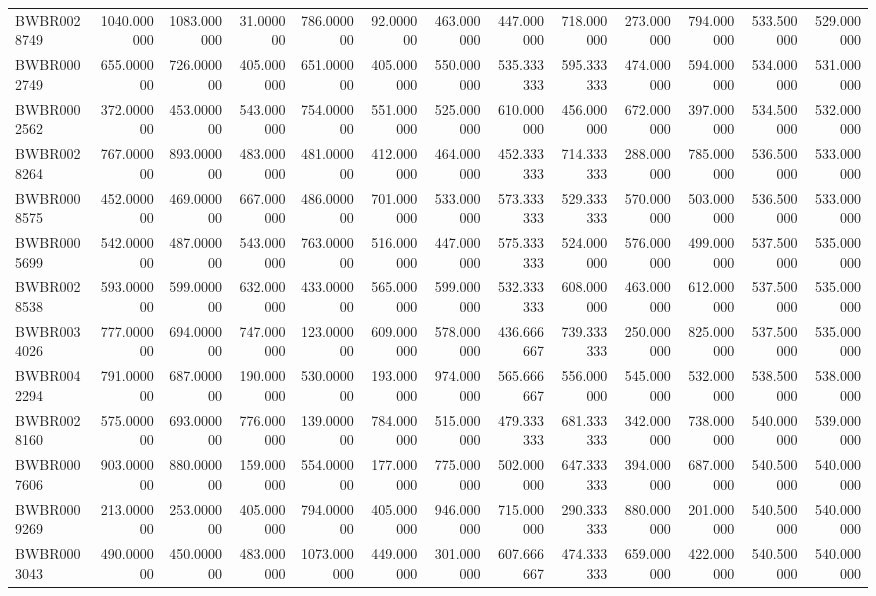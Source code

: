 \begin{longtable}{lrrrrrrrrrrrr}
BWBR0028749 & 1040.000000 & 1083.000000 & 31.000000 & 786.000000 & 92.000000 & 463.000000 & 447.000000 & 718.000000 & 273.000000 & 794.000000 & 533.500000 & 529.000000 \\
BWBR0002749 & 655.000000 & 726.000000 & 405.000000 & 651.000000 & 405.000000 & 550.000000 & 535.333333 & 595.333333 & 474.000000 & 594.000000 & 534.000000 & 531.000000 \\
BWBR0002562 & 372.000000 & 453.000000 & 543.000000 & 754.000000 & 551.000000 & 525.000000 & 610.000000 & 456.000000 & 672.000000 & 397.000000 & 534.500000 & 532.000000 \\
BWBR0028264 & 767.000000 & 893.000000 & 483.000000 & 481.000000 & 412.000000 & 464.000000 & 452.333333 & 714.333333 & 288.000000 & 785.000000 & 536.500000 & 533.000000 \\
BWBR0008575 & 452.000000 & 469.000000 & 667.000000 & 486.000000 & 701.000000 & 533.000000 & 573.333333 & 529.333333 & 570.000000 & 503.000000 & 536.500000 & 533.000000 \\
BWBR0005699 & 542.000000 & 487.000000 & 543.000000 & 763.000000 & 516.000000 & 447.000000 & 575.333333 & 524.000000 & 576.000000 & 499.000000 & 537.500000 & 535.000000 \\
BWBR0028538 & 593.000000 & 599.000000 & 632.000000 & 433.000000 & 565.000000 & 599.000000 & 532.333333 & 608.000000 & 463.000000 & 612.000000 & 537.500000 & 535.000000 \\
BWBR0034026 & 777.000000 & 694.000000 & 747.000000 & 123.000000 & 609.000000 & 578.000000 & 436.666667 & 739.333333 & 250.000000 & 825.000000 & 537.500000 & 535.000000 \\
BWBR0042294 & 791.000000 & 687.000000 & 190.000000 & 530.000000 & 193.000000 & 974.000000 & 565.666667 & 556.000000 & 545.000000 & 532.000000 & 538.500000 & 538.000000 \\
BWBR0028160 & 575.000000 & 693.000000 & 776.000000 & 139.000000 & 784.000000 & 515.000000 & 479.333333 & 681.333333 & 342.000000 & 738.000000 & 540.000000 & 539.000000 \\
BWBR0007606 & 903.000000 & 880.000000 & 159.000000 & 554.000000 & 177.000000 & 775.000000 & 502.000000 & 647.333333 & 394.000000 & 687.000000 & 540.500000 & 540.000000 \\
BWBR0009269 & 213.000000 & 253.000000 & 405.000000 & 794.000000 & 405.000000 & 946.000000 & 715.000000 & 290.333333 & 880.000000 & 201.000000 & 540.500000 & 540.000000 \\
BWBR0003043 & 490.000000 & 450.000000 & 483.000000 & 1073.000000 & 449.000000 & 301.000000 & 607.666667 & 474.333333 & 659.000000 & 422.000000 & 540.500000 & 540.000000 \\

\end{longtable}
